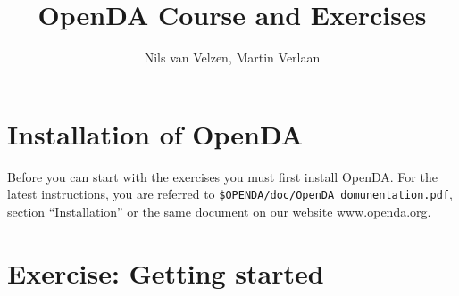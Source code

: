 \documentclass[a4paper,10pt]{article}
\title{OpenDA Course and Exercises}
\author{Nils van Velzen, Martin Verlaan}
\begin{document}


\maketitle


\tableofcontents

\section*{Installation of OpenDA}
Before you can start with the exercises you must first install OpenDA. For the
latest instructions, you are referred to \verb|$OPENDA/doc/OpenDA_domunentation.pdf|, 
section ``Installation'' or the same document on our website \url{www.openda.org}.

\newpage
\section{Exercise: Getting started}

\end{document}
